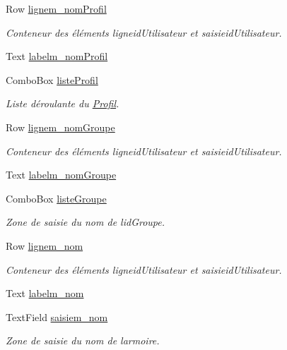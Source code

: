 \begin{DoxyCompactItemize}
Row \hyperlink{class_suppression_utilisateur_aabbcbad49510efdf542385a77347691f}{lignem\+\_\+nom\+Profil}
\begin{DoxyCompactList}\small\item\em Conteneur des éléments ligneid\+Utilisateur et saisieid\+Utilisateur. \end{DoxyCompactList}\item 
Text \hyperlink{class_suppression_utilisateur_a916dfa26a46dd00e1683d5a73e8365a3}{labelm\+\_\+nom\+Profil}
\item 
Combo\+Box \hyperlink{class_suppression_utilisateur_a146b36eeb61dbfa4943c5a3103f249f4}{liste\+Profil}
\begin{DoxyCompactList}\small\item\em Liste déroulante du \hyperlink{class_profil}{Profil}. \end{DoxyCompactList}\item 
Row \hyperlink{class_suppression_utilisateur_ad4a8bd135b7235e0743d49af13adb693}{lignem\+\_\+nom\+Groupe}
\begin{DoxyCompactList}\small\item\em Conteneur des éléments ligneid\+Utilisateur et saisieid\+Utilisateur. \end{DoxyCompactList}\item 
Text \hyperlink{class_suppression_utilisateur_addd69318a3f60ed882ae84dbcf7791ed}{labelm\+\_\+nom\+Groupe}
\item 
Combo\+Box \hyperlink{class_suppression_utilisateur_ab1c1a3e6f22c6d37d46ee56787f0668f}{liste\+Groupe}
\begin{DoxyCompactList}\small\item\em Zone de saisie du nom de l\textquotesingle{}id\+Groupe. \end{DoxyCompactList}\item 
Row \hyperlink{class_suppression_utilisateur_a467331f68fcab97a7d53131f713105d2}{lignem\+\_\+nom}
\begin{DoxyCompactList}\small\item\em Conteneur des éléments ligneid\+Utilisateur et saisieid\+Utilisateur. \end{DoxyCompactList}\item 
Text \hyperlink{class_suppression_utilisateur_a06246d594e0df2863172500499a83c65}{labelm\+\_\+nom}
\item 
Text\+Field \hyperlink{class_suppression_utilisateur_a32b68b37c0a5ae15d77aedb4d661411c}{saisiem\+\_\+nom}
\begin{DoxyCompactList}\small\item\em Zone de saisie du nom de l\textquotesingle{}armoire. \end{DoxyCompactList}\item 

\end{DoxyCompactItemize}

